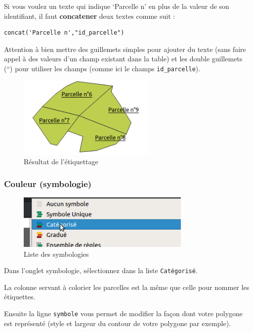 Si vous voulez un texte qui indique `Parcelle n' en plus de la valeur de
son identifiant, il faut \textbf{concatener} deux textes comme suit :

\begin{verbatim}
concat('Parcelle n',"id_parcelle")
\end{verbatim}

Attention à bien mettre des guillemets simples pour ajouter du texte
(sans faire appel à des valeurs d'un champ existant dans la table) et
les double guillemets (``) pour utiliser les champs (comme ici le champs
\texttt{id\_parcelle}).

\begin{figure}[htbp]
\centering
\includegraphics[height=1.56250in]{figures/parcelle_num.png}
\caption{Résultat de l'étiquettage}
\end{figure}

\subsubsection{Couleur (symbologie)}\label{couleur-symbologie}

\begin{figure}[htbp]
\centering
\includegraphics[height=1.04167in]{figures/symbologie.png}
\caption{Liste des symbologies}
\end{figure}

Dans l'onglet symbologie, sélectionnez dans la liste
\texttt{Catégorisé}.

La colonne servant à colorier les parcelles est la même que celle pour
nommer les étiquettes.

Ensuite la ligne \texttt{symbole} vous permet de modifier la façon dont
votre polygone est représenté (style et largeur du contour de votre
polygone par exemple).

